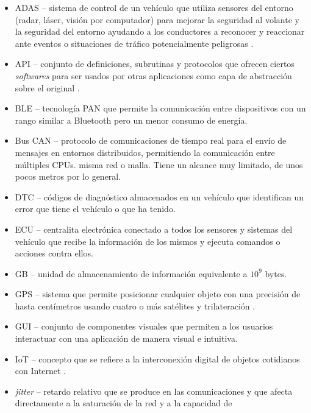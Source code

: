 \begin{itemize}
  \item \ac{ADAS} -- sistema de control de un vehículo que utiliza sensores del entorno
        (radar, láser, visión por computador) para mejorar la seguridad al volante y
        la seguridad del entorno ayudando a los conductores a reconocer y reaccionar
        ante eventos o situaciones de tráfico potencialmente peligrosas \cite{hermawanAcquisitionModelingEvaluating2020}.
  \item \ac{API} -- conjunto de definiciones, subrutinas y protocolos que ofrecen
        ciertos \textit{softwares} para ser usados por otras aplicaciones como
        capa de abstracción sobre el original \cite{InterfazProgramacionAplicaciones2021}.
  \item \ac{BLE} -- tecnología \ac{PAN} que permite la comunicación entre dispositivos
        con un rango similar a Bluetooth pero un menor consumo de energía.
  \item Bus \ac{CAN} -- protocolo de comunicaciones de tiempo real para el envío de
        mensajes en entornos distribuidos, permitiendo la comunicación
        entre múltiples CPUs.
        misma red o malla. Tiene un alcance muy limitado, de unos pocos metros por
        lo general.
  \item \ac{DTC} -- códigos de diagnóstico almacenados en un vehículo que identifican
        un error que tiene el vehículo o que ha tenido.
  \item \ac{ECU} -- centralita electrónica conectado a todos los sensores y sistemas
        del vehículo que recibe la información de los mismos y ejecuta comandos o acciones
        contra ellos.
  \item \ac{GB} -- unidad de almacenamiento de información equivalente a $10^9$ bytes.
  \item \ac{GPS} -- sistema que permite posicionar cualquier objeto con una 
        precisión de hasta centímetros usando cuatro o más satélites y 
        trilateración \cite{GPS2021}.
  \item \ac{GUI} -- conjunto de componentes visuales que permiten a los usuarios
        interactuar con una aplicación de manera visual e intuitiva.
  \item \ac{IoT} -- concepto que se refiere a la interconexión digital de objetos 
        cotidianos con Internet \cite{InternetCosas2021}.
  \item \textit{jitter} -- retardo relativo que se produce en las comunicaciones
        y que afecta directamente a la saturación de la red y a la capacidad de

\end{itemize}
